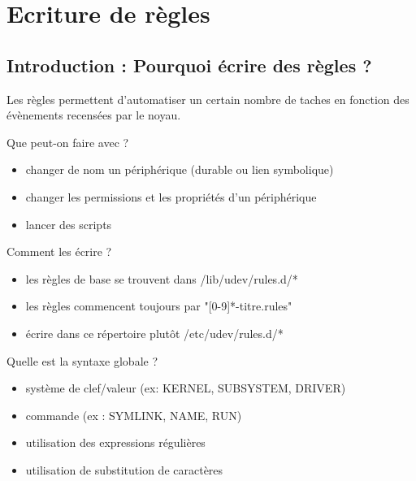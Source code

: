 \documentclass{beamer}
\begin{document}
\section{Ecriture de règles}

\subsection{Introduction : Pourquoi écrire des règles ?}

\begin{frame}
Les règles permettent d'automatiser un certain nombre de taches en fonction des évènements recensées par le noyau.

\begin{block}{Que peut-on faire avec ?} 
	
	\begin{itemize}
		[circle]
		\item changer de nom un périphérique (durable ou lien symbolique)
		\item changer les permissions et les propriétés d'un périphérique
		\item lancer des scripts
	\end{itemize}
\end{block}

\begin{block}{Comment les écrire ?} 
	
	\begin{itemize}
		[circle]
		\item les règles de base se trouvent dans /lib/udev/rules.d/*
		\item les règles commencent toujours par "[0-9]*-titre.rules"
		\item écrire dans ce répertoire plutôt /etc/udev/rules.d/*
	\end{itemize}
\end{block}
\end{frame}

\begin{frame}
\begin{block}{Quelle est la syntaxe globale ?} 
	
	\begin{itemize}
		[circle]
		\item système de clef/valeur (ex: KERNEL, SUBSYSTEM, DRIVER) 
		\item commande (ex : SYMLINK, NAME, RUN)
		\item utilisation des expressions régulières
		\item utilisation de substitution de caractères
	\end{itemize}
\end{block}
\end{frame}
\end{document}
